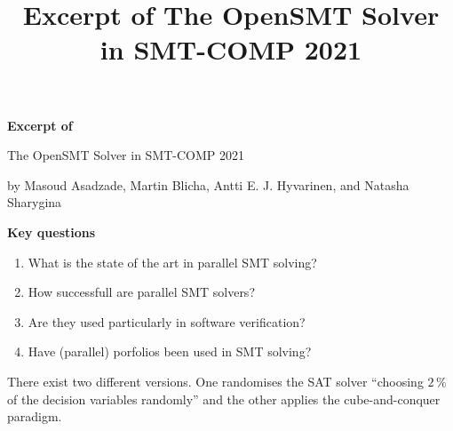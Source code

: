 \documentclass{scrartcl}
\title{Excerpt of The OpenSMT Solver in SMT-COMP 2021}
\begin{document}
\begin{center}
    \Large{\textbf{Excerpt of}}

    \LARGE{The OpenSMT Solver in SMT-COMP 2021}

    \large{by Masoud Asadzade, Martin Blicha, Antti E. J. Hyvarinen, and Natasha Sharygina}
\end{center}

\vspace{1cm}

\begin{addmargin}[0.2\linewidth]{0.2\linewidth}
    \begin{center}
        \textbf{Key questions}
    \end{center}
    \begin{enumerate}[i]
        \item What is the state of the art in parallel SMT solving?
        \item How successfull are parallel SMT solvers?
        \item Are they used particularly in software verification?
        \item Have (parallel) porfolios been used in SMT solving?
    \end{enumerate}
\end{addmargin}

\vspace{1cm}

There exist two different versions.
One randomises the SAT solver \enquote{choosing \(2\, \%\) of the decision variables randomly}
and the other applies the cube-and-conquer paradigm.
\end{document}
